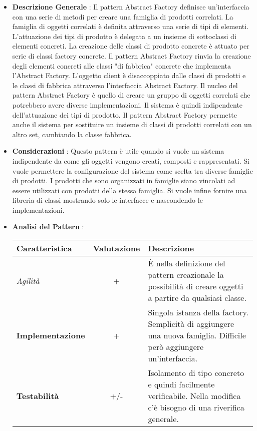 {{{			\begin{itemize}\itemsep1pt
				\item \textbf{Descrizione Generale} : Il pattern Abstract Factory definisce un'interfaccia con una serie di metodi per creare una famiglia di prodotti correlati. La famiglia di oggetti correlati è definita attraverso una serie di tipi di elementi. L'attuazione dei tipi di prodotto è delegata a un insieme di sottoclassi di elementi concreti. La creazione delle classi di prodotto concrete è attuato per serie di classi factory concrete. Il pattern Abstract Factory rinvia la creazione degli elementi concreti alle classi "di fabbrica" concrete che implementa l'Abstract Factory. L'oggetto client è disaccoppiato dalle classi di prodotti e le classi di fabbrica attraverso l'interfaccia Abstract Factory. Il nucleo del pattern Abstract Factory è quello di creare un gruppo di oggetti correlati che potrebbero avere diverse implementazioni. Il sistema è quindi indipendente dell'attuazione dei tipi di prodotto. Il pattern Abstract Factory permette anche il sistema per sostituire un insieme di classi di prodotti correlati con un altro set, cambiando la classe fabbrica.
				\item \textbf{Considerazioni} : Questo pattern è utile quando si vuole un sistema indipendente da come gli oggetti vengono creati, composti e rappresentati. Si vuole permettere la configurazione del sistema come scelta tra diverse famiglie di prodotti. I prodotti che sono organizzati in famiglie siano vincolati ad essere utilizzati con prodotti della stessa famiglia. Si vuole infine fornire una libreria di classi mostrando solo le interfacce e nascondendo le implementazioni.
				\item \textbf{Analisi del Pattern} :
				\small %
				{\renewcommand\arraystretch{1.2} %
					\begin{tabular}{|l|c|l|}
						\hline
						{\textbf{Caratteristica}}&{\textbf{Valutazione}}&{\textbf{Descrizione}}\\
						\hline
						\textit{Agilità} & + & È nella definizione del pattern creazionale la possibilità di creare oggetti a partire da qualsiasi classe. \\
						\hline
						\textbf{Implementazione} & + & Singola istanza della factory. Semplicità di aggiungere una nuova famiglia. Difficile però aggiungere un'interfaccia. \\
						\hline
						\textbf{Testabilità} & +/- & Isolamento di tipo concreto e quindi facilmente verificabile. Nella modifica c'è bisogno di una riverifica generale. \\

\end{tabular}}
\end{itemize}}}}
